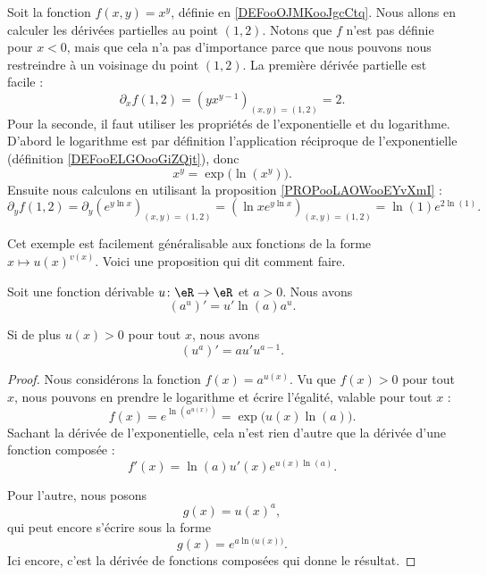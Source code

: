	\begin{example}     \label{EXooGMRIooUucRez}
		Soit la fonction \( f(x,y)=x^y\), définie en \ref{DEFooOJMKooJgcCtq}. Nous allons en calculer les dérivées partielles au point \( (1,2)\). Notons que \( f\) n'est pas définie pour \( x<0\), mais que cela n'a pas d'importance parce que nous pouvons nous restreindre à un voisinage du point \( (1,2)\). La première dérivée partielle est facile :
		\[
			\partial_x f(1,2)=(yx^{y-1})_{(x,y)=(1,2)}=2.
		\]
		Pour la seconde, il faut utiliser les propriétés de l'exponentielle et du logarithme. D'abord le logarithme est par définition l'application réciproque de l'exponentielle (définition \ref{DEFooELGOooGiZQjt}), donc
		\begin{equation}
			x^y=\exp\big( \ln(x^y) \big).
		\end{equation}
		Ensuite nous calculons en utilisant la proposition \ref{PROPooLAOWooEYvXmI} :
        \begin{equation}
            \partial_y f(1,2)=\partial_y\left(e^{y\ln x}\right)_{(x,y)=(1,2)}=\left(\ln x e^{y\ln x}\right)_{(x,y)=(1,2)}=\ln(1) e^{2\ln(1)}.
        \end{equation}
	\end{example}


	Cet exemple est facilement généralisable aux fonctions de la forme \( x\mapsto u(x)^{v(x)}\). Voici une proposition qui dit comment faire.
	\begin{proposition}     \label{PROPooKUULooKSEULJ}
		Soit une fonction dérivable \( u\colon \eR\to \eR\) et \( a>0\). Nous avons
		\begin{equation}
			\left( a^u\right)'=u'\ln(a)a^u.
		\end{equation}

		Si de plus \( u(x)>0\) pour tout \( x\), nous avons
		\begin{equation}
			\left( u^a \right)'=au'u^{a-1}.
		\end{equation}
	\end{proposition}

	\begin{proof}
		Nous considérons la fonction \( f(x)= a^{u(x)}\). Vu que \( f(x)>0\) pour tout \( x\), nous pouvons en prendre le logarithme et écrire l'égalité, valable pour tout \( x\) :
		\begin{equation}
			f(x)= e^{\ln(a^{u(x)})}=\exp\big( u(x)\ln(a) \big).
		\end{equation}
		Sachant la dérivée de l'exponentielle, cela n'est rien d'autre que la dérivée d'une fonction composée :
		\begin{equation}
			f'(x)=\ln(a) u'(x) e^{u(x)\ln(a)}.
		\end{equation}

		Pour l'autre, nous posons
		\begin{equation}
			g(x)=u(x)^a,
		\end{equation}
		qui peut encore s'écrire sous la forme
		\begin{equation}
			g(x)= e^{a\ln\big( u(x) \big)}.
		\end{equation}
		Ici encore, c'est la dérivée de fonctions composées qui donne le résultat.
	\end{proof}

